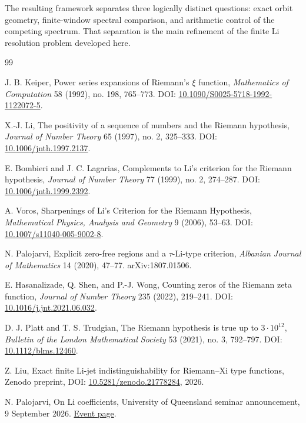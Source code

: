 \documentclass[11pt]{article}
\begin{document}
The resulting framework separates three logically distinct questions: exact orbit geometry, finite-window spectral comparison, and arithmetic control of the competing spectrum. That separation is the main refinement of the finite Li resolution problem developed here.

\begin{thebibliography}{99}

J. B. Keiper,
\newblock Power series expansions of Riemann's $\xi$ function,
\newblock \emph{Mathematics of Computation} 58 (1992), no. 198, 765--773.
\newblock DOI: \href{https://doi.org/10.1090/S0025-5718-1992-1122072-5}{10.1090/S0025-5718-1992-1122072-5}.

X.-J. Li,
\newblock The positivity of a sequence of numbers and the Riemann hypothesis,
\newblock \emph{Journal of Number Theory} 65 (1997), no. 2, 325--333.
\newblock DOI: \href{https://doi.org/10.1006/jnth.1997.2137}{10.1006/jnth.1997.2137}.

E. Bombieri and J. C. Lagarias,
\newblock Complements to Li's criterion for the Riemann hypothesis,
\newblock \emph{Journal of Number Theory} 77 (1999), no. 2, 274--287.
\newblock DOI: \href{https://doi.org/10.1006/jnth.1999.2392}{10.1006/jnth.1999.2392}.

A. Voros,
\newblock Sharpenings of Li's Criterion for the Riemann Hypothesis,
\newblock \emph{Mathematical Physics, Analysis and Geometry} 9 (2006), 53--63.
\newblock DOI: \href{https://doi.org/10.1007/s11040-005-9002-8}{10.1007/s11040-005-9002-8}.

N. Palojarvi,
\newblock Explicit zero-free regions and a $\tau$-Li-type criterion,
\newblock \emph{Albanian Journal of Mathematics} 14 (2020), 47--77.
\newblock arXiv:1807.01506.

E. Hasanalizade, Q. Shen, and P.-J. Wong,
\newblock Counting zeros of the Riemann zeta function,
\newblock \emph{Journal of Number Theory} 235 (2022), 219--241.
\newblock DOI: \href{https://doi.org/10.1016/j.jnt.2021.06.032}{10.1016/j.jnt.2021.06.032}.

D. J. Platt and T. S. Trudgian,
\newblock The Riemann hypothesis is true up to $3\cdot10^{12}$,
\newblock \emph{Bulletin of the London Mathematical Society} 53 (2021), no. 3, 792--797.
\newblock DOI: \href{https://doi.org/10.1112/blms.12460}{10.1112/blms.12460}.

Z. Liu,
\newblock Exact finite Li-jet indistinguishability for Riemann--Xi type functions,
\newblock Zenodo preprint, DOI: \href{https://doi.org/10.5281/zenodo.21778284}{10.5281/zenodo.21778284}, 2026.

N. Palojarvi,
\newblock On Li coefficients,
\newblock University of Queensland seminar announcement, 9 September 2026.
\newblock \href{https://smp.uq.edu.au/event/session/17711}{Event page}.

\end{thebibliography}
\end{document}
